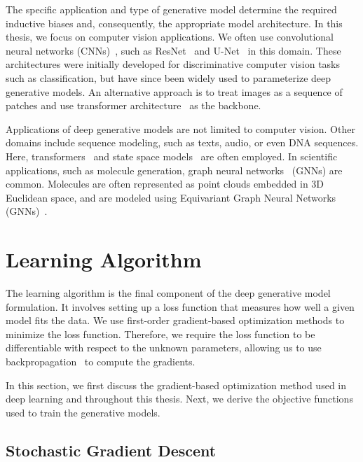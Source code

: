 The specific application and type of generative model determine the required inductive biases and, consequently, the appropriate model architecture.
In this thesis, we focus on computer vision applications. We often use convolutional neural networks (CNNs)~\citep{krizhevsky2012imagenet}, such as ResNet~\citep{he2016deep} and U-Net~\citep{ronneberger2015u} in this domain. 
These architectures were initially developed for discriminative computer vision tasks such as classification, but have since been widely used to parameterize deep generative models. An alternative approach is to treat images as a sequence of patches and use transformer architecture~\citep{dosovitskiy2021an} as the backbone.

Applications of deep generative models are not limited to computer vision. Other domains include sequence modeling, such as texts, audio, or even DNA sequences. Here, transformers~\citep{vaswani2017attention, hoffmann2022empirical} and state space models~\citep{gu2021combining, nguyen2024hyenadna} are often employed. 
In scientific applications, such as molecule generation, graph neural networks~\citep{bruna2013spectral, kipf2016semi} (GNNs) are common. Molecules are often represented as point clouds embedded in 3D Euclidean space, and are modeled using Equivariant Graph Neural Networks (GNNs)~\citep{kohler2020equivariant, satorras2021n}. 

\section{Learning Algorithm}\label{sec:intro_learning_algo}
The learning algorithm is the final component of the deep generative model formulation. 
It involves setting up a loss function that measures how well a given model fits the data.
We use first-order gradient-based optimization methods to minimize the loss function. 
Therefore, we require the loss function to be differentiable with respect to the unknown parameters, allowing us to use backpropagation~\citep{rumelhart1986learning} to compute the gradients.

In this section, we first discuss the gradient-based optimization method used in deep learning and throughout this thesis. 
Next, we derive the objective functions used to train the generative models.

\subsection{Stochastic Gradient Descent}

